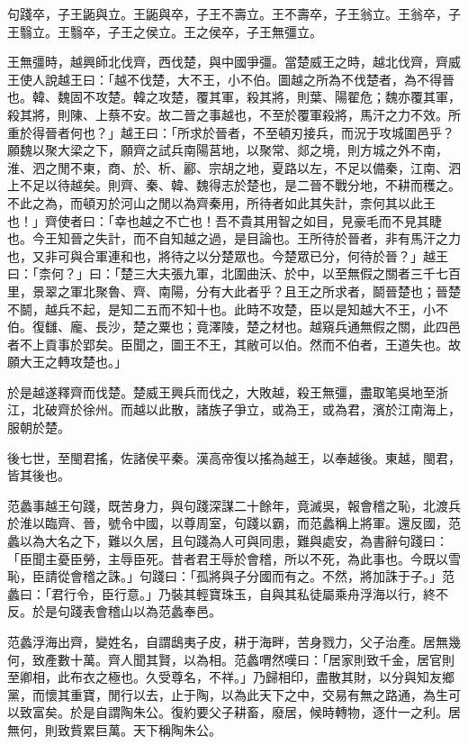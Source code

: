 \begin{pinyinscope}
句踐卒，子王鼫與立。王鼫與卒，子王不壽立。王不壽卒，子王翁立。王翁卒，子王翳立。王翳卒，子王之侯立。王之侯卒，子王無彊立。

王無彊時，越興師北伐齊，西伐楚，與中國爭彊。當楚威王之時，越北伐齊，齊威王使人說越王曰：「越不伐楚，大不王，小不伯。圖越之所為不伐楚者，為不得晉也。韓、魏固不攻楚。韓之攻楚，覆其軍，殺其將，則葉、陽翟危；魏亦覆其軍，殺其將，則陳、上蔡不安。故二晉之事越也，不至於覆軍殺將，馬汗之力不效。所重於得晉者何也？」越王曰：「所求於晉者，不至頓刃接兵，而況于攻城圍邑乎？願魏以聚大梁之下，願齊之試兵南陽莒地，以聚常、郯之境，則方城之外不南，淮、泗之閒不東，商、於、析、酈、宗胡之地，夏路以左，不足以備秦，江南、泗上不足以待越矣。則齊、秦、韓、魏得志於楚也，是二晉不戰分地，不耕而穫之。不此之為，而頓刃於河山之閒以為齊秦用，所待者如此其失計，柰何其以此王也！」齊使者曰：「幸也越之不亡也！吾不貴其用智之如目，見豪毛而不見其睫也。今王知晉之失計，而不自知越之過，是目論也。王所待於晉者，非有馬汗之力也，又非可與合軍連和也，將待之以分楚眾也。今楚眾已分，何待於晉？」越王曰：「柰何？」曰：「楚三大夫張九軍，北圍曲沃、於中，以至無假之關者三千七百里，景翠之軍北聚魯、齊、南陽，分有大此者乎？且王之所求者，鬬晉楚也；晉楚不鬬，越兵不起，是知二五而不知十也。此時不攻楚，臣以是知越大不王，小不伯。復讎、龐、長沙，楚之粟也；竟澤陵，楚之材也。越窺兵通無假之關，此四邑者不上貢事於郢矣。臣聞之，圖王不王，其敝可以伯。然而不伯者，王道失也。故願大王之轉攻楚也。」

於是越遂釋齊而伐楚。楚威王興兵而伐之，大敗越，殺王無彊，盡取笔吳地至浙江，北破齊於徐州。而越以此散，諸族子爭立，或為王，或為君，濱於江南海上，服朝於楚。

後七世，至閩君搖，佐諸侯平秦。漢高帝復以搖為越王，以奉越後。東越，閩君，皆其後也。

范蠡事越王句踐，既苦身力，與句踐深謀二十餘年，竟滅吳，報會稽之恥，北渡兵於淮以臨齊、晉，號令中國，以尊周室，句踐以霸，而范蠡稱上將軍。還反國，范蠡以為大名之下，難以久居，且句踐為人可與同患，難與處安，為書辭句踐曰：「臣聞主憂臣勞，主辱臣死。昔者君王辱於會稽，所以不死，為此事也。今既以雪恥，臣請從會稽之誅。」句踐曰：「孤將與子分國而有之。不然，將加誅于子。」范蠡曰：「君行令，臣行意。」乃裝其輕寶珠玉，自與其私徒屬乘舟浮海以行，終不反。於是句踐表會稽山以為范蠡奉邑。

范蠡浮海出齊，變姓名，自謂鴟夷子皮，耕于海畔，苦身戮力，父子治產。居無幾何，致產數十萬。齊人聞其賢，以為相。范蠡喟然嘆曰：「居家則致千金，居官則至卿相，此布衣之極也。久受尊名，不祥。」乃歸相印，盡散其財，以分與知友鄉黨，而懷其重寶，閒行以去，止于陶，以為此天下之中，交易有無之路通，為生可以致富矣。於是自謂陶朱公。復約要父子耕畜，廢居，候時轉物，逐什一之利。居無何，則致貲累巨萬。天下稱陶朱公。


\end{pinyinscope}
